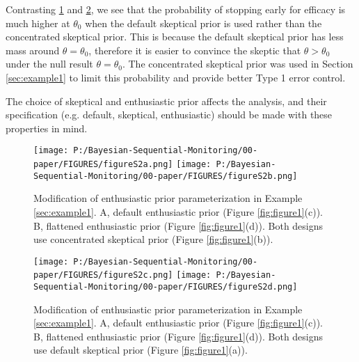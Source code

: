 \documentclass[12pt]{article}
\begin{document}
Contrasting \ref{fig:robustness1} and \ref{fig:robustness2}, we see that the probability of stopping early for efficacy is much higher at $\theta_0$ when the default skeptical prior is used rather than the concentrated skeptical prior. This is because the default skeptical prior has less mass around $\theta=\theta_0$, therefore it is easier to convince the skeptic that $\theta>\theta_0$ under the null result $\theta=\theta_0$. The concentrated skeptical prior was used in Section \ref{sec:example1} to limit this probability and provide better Type 1 error control.

The choice of skeptical and enthusiastic prior affects the analysis, and their specification (e.g. default, skeptical, enthusiastic) should be made with these properties in mind.

\begin{figure}\begin{center}

 \texttt{[image: P:/Bayesian-Sequential-Monitoring/00-paper/FIGURES/figureS2a.png]}
 \texttt{[image: P:/Bayesian-Sequential-Monitoring/00-paper/FIGURES/figureS2b.png]}
 \caption{Modification of enthusiastic prior parameterization in Example \ref{sec:example1}. A, default enthusiastic prior (Figure \ref{fig:figure1}(c)). B, flattened enthusiastic prior (Figure \ref{fig:figure1}(d)). Both designs use concentrated skeptical prior (Figure \ref{fig:figure1}(b)).}
\label{fig:robustness1}
\end{center}\end{figure}

\begin{figure}\begin{center}

 \texttt{[image: P:/Bayesian-Sequential-Monitoring/00-paper/FIGURES/figureS2c.png]}
 \texttt{[image: P:/Bayesian-Sequential-Monitoring/00-paper/FIGURES/figureS2d.png]}
 \caption{Modification of enthusiastic prior parameterization in Example \ref{sec:example1}. A, default enthusiastic prior (Figure \ref{fig:figure1}(c)). B, flattened enthusiastic prior (Figure \ref{fig:figure1}(d)). Both designs use default skeptical prior (Figure \ref{fig:figure1}(a)).}
\label{fig:robustness2}
\end{center}\end{figure}

\newpage
\newpage
 
 	
\end{document}
